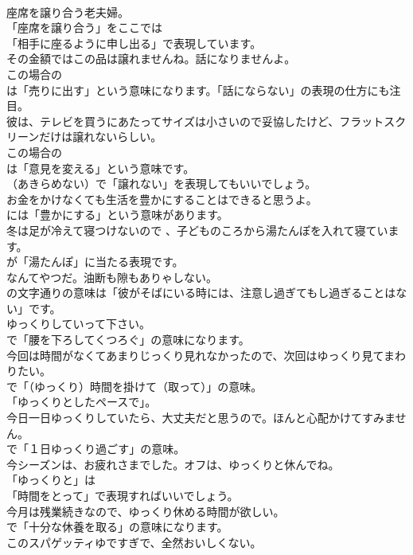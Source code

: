 \documentclass[8pt]{extreport}
\begin{document}
\begin{CJK}{UTF8}{min}
\\	座席を譲り合う老夫婦。 
\\	「座席を譲り合う」をここでは
\\	「相手に座るように申し出る」で表現しています。	
\\	その金額ではこの品は譲れませんね。話になりませんよ。 
\\	この場合の
\\	は「売りに出す」という意味になります。「話にならない」の表現の仕方にも注目。	
\\	彼は、テレビを買うにあたってサイズは小さいので妥協したけど、フラットスクリーンだけは譲れないらしい。 
\\	この場合の 
\\	は「意見を変える」という意味です。
\\	（あきらめない）で「譲れない」を表現してもいいでしょう。	
\\	お金をかけなくても生活を豊かにすることはできると思うよ。 
\\	には「豊かにする」という意味があります。	
\\	冬は足が冷えて寝つけないので 、子どものころから湯たんぽを入れて寝ています。 
\\	が「湯たんぽ」に当たる表現です。	
\\	なんてやつだ。油断も隙もありゃしない。 
\\	の文字通りの意味は「彼がそばにいる時には、注意し過ぎてもし過ぎることはない」です。	
\\	ゆっくりしていって下さい。 
\\	で「腰を下ろしてくつろぐ」の意味になります。	
\\	今回は時間がなくてあまりじっくり見れなかったので、次回はゆっくり見てまわりたい。 
\\	で「（ゆっくり）時間を掛けて（取って）」の意味。
\\	「ゆっくりとしたペースで」。	
\\	今日一日ゆっくりしていたら、大丈夫だと思うので。ほんと心配かけてすみません。 
\\	で「１日ゆっくり過ごす」の意味。	
\\	今シーズンは、お疲れさまでした。オフは、ゆっくりと休んでね。 
\\	「ゆっくりと」は
\\	「時間をとって」で表現すればいいでしょう。	
\\	今月は残業続きなので、ゆっくり休める時間が欲しい。 
\\	で「十分な休養を取る」の意味になります。	
\\	このスパゲッティゆですぎで、全然おいしくない。 

\end{CJK}
\end{document}
